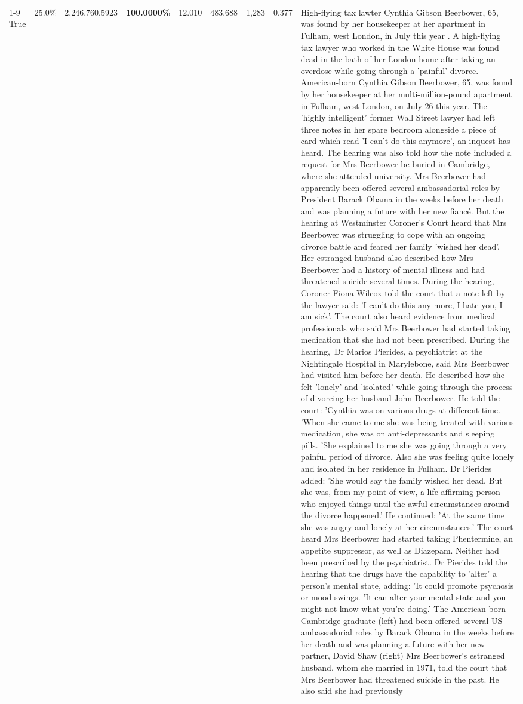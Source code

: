 \begin{table}[H]
\begin{tabular}{lllrlllll}
\cline{1-9}
True & 25.0\% & 2,246,760.5923 & \bfseries \color{red} 100.0000\% & 12.010 & 483.688 & 1,283 & 0.377 & High-flying tax lawter Cynthia Gibson Beerbower, 65, was found by her housekeeper at her apartment in Fulham, west London, in July this year . A high-flying tax lawyer who worked in the White House was found dead in the bath of her London home after taking an overdose while going through a 'painful' divorce. American-born Cynthia Gibson Beerbower, 65, was found by her housekeeper at her multi-million-pound apartment in Fulham, west London, on July 26 this year. The 'highly intelligent' former Wall Street lawyer had left three notes in her spare bedroom alongside a piece of card which read 'I can't do this anymore', an inquest has heard. The hearing was also told how the note included a request for Mrs Beerbower be buried in Cambridge, where she attended university. Mrs Beerbower had apparently been offered several ambassadorial roles by President Barack Obama in the weeks before her death and was planning a future with her new fiancé. But the hearing at Westminster Coroner's Court heard that Mrs Beerbower was struggling to cope with an ongoing divorce battle and feared her family 'wished her dead'. Her estranged husband also described how Mrs Beerbower had a history of mental illness and had threatened suicide several times. During the hearing, Coroner Fiona Wilcox told the court that a note left by the lawyer said: 'I can't do this any more, I hate you, I am sick'. The court also heard evidence from medical professionals who said Mrs Beerbower had started taking medication that she had not been prescribed. During the hearing, Dr Marios Pierides, a psychiatrist at the Nightingale Hospital in Marylebone, said Mrs Beerbower had visited him before her death. He described how she felt 'lonely' and 'isolated' while going through the process of divorcing her husband John Beerbower. He told the court: 'Cynthia was on various drugs at different time. 'When she came to me she was being treated with various medication, she was on anti-depressants and sleeping pills. 'She explained to me she was going through a very painful period of divorce. Also she was feeling quite lonely and isolated in her residence in Fulham. Dr Pierides added: 'She would say the family wished her dead. But she was, from my point of view, a life affirming person who enjoyed things until the awful circumstances around the divorce happened.' He continued: 'At the same time she was angry and lonely at her circumstances.' The court heard Mrs Beerbower had started taking Phentermine, an appetite suppressor, as well as Diazepam. Neither had been prescribed by the psychiatrist. Dr Pierides told the hearing that the drugs have the capability to 'alter' a person's mental state, adding: 'It could promote psychosis or mood swings. 'It can alter your mental state and you might not know what you're doing.' The American-born Cambridge graduate (left) had been offered several US ambassadorial roles by Barack Obama in the weeks before her death and was planning a future with her new partner, David Shaw (right) Mrs Beerbower's estranged husband, whom she married in 1971, told the court that Mrs Beerbower had threatened suicide in the past. He also said she had previously 
\end{tabular}
\end{table}
